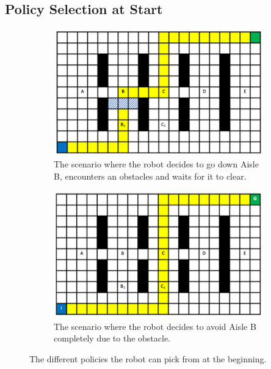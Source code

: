 \documentclass[a4paper,12pt]{article}
\begin{document}
		\subsection{Policy Selection at Start}
		\label{sec:policySelectionAtStart}
		
			\begin{figure}[H]
				\centering
				\begin{subfigure}{.4\textwidth}
					\centering
					\includegraphics[width=\linewidth]{blockedAisleB.png}
					\caption{The scenario where the robot decides to go down Aisle B, encounters an obstacles and waits for it to clear.}
					\label{fig:plannedPathAisleB}
				\end{subfigure}
				\begin{subfigure}{.4\textwidth}
					\centering
					\includegraphics[width=\linewidth]{plannedPathAisleC.png}
					\caption{The scenario where the robot decides to avoid Aisle B completely due to the obstacle.}
					\label{fig:plannedPathAisleC}
				\end{subfigure}
				\caption{The different policies the robot can pick from at the beginning.}
				\label{fig:task1_2Figures}
			\end{figure}
			
\end{document}
